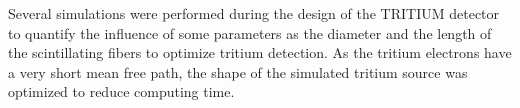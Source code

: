 Several simulations were performed during the design of the TRITIUM detector to quantify the influence of some parameters as the diameter and the length of the scintillating fibers to optimize tritium detection. As the tritium electrons have a very short mean free path, the shape of the simulated tritium source was optimized to reduce computing time. 